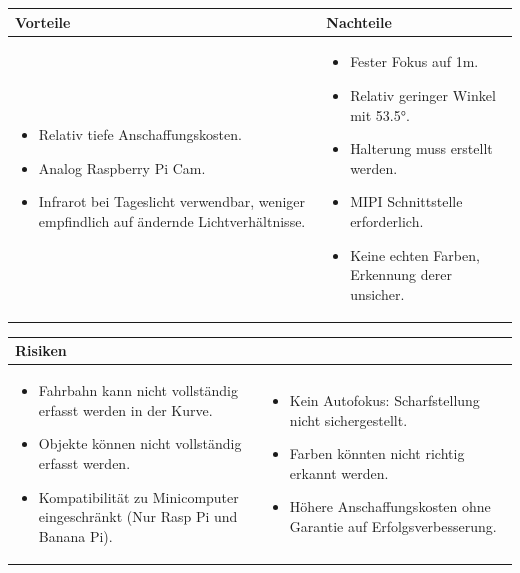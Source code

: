 \begin{table}[h]
\begin{tabular}{p{} | p{}}


 \textbf{Vorteile} & \textbf{Nachteile} \\ \hline
	 
\begin{itemize}
\item Relativ tiefe Anschaffungskosten.
\item Analog Raspberry Pi Cam.
\item Infrarot bei Tageslicht verwendbar, weniger empfindlich auf ändernde Lichtverhältnisse.
\end{itemize}

 
 &
 
\begin{itemize}
\item Fester Fokus auf 1m.
\item Relativ geringer Winkel mit 53.5°.
\item Halterung muss erstellt werden.
\item MIPI Schnittstelle erforderlich.
\item Keine echten Farben, Erkennung derer unsicher.
\end{itemize}

\end{tabular}
\end{table}

\begin{table}[h]
\begin{tabular}{p{}p{}}


 \textbf{Risiken} & \\ \hline
	 
\begin{itemize}
\item Fahrbahn kann nicht vollständig erfasst werden in der Kurve.
\item Objekte können nicht vollständig erfasst werden.
\item Kompatibilität zu Minicomputer eingeschränkt (Nur Rasp Pi und Banana Pi).
\end{itemize}
&
\begin{itemize}
\item Kein Autofokus: Scharfstellung nicht sichergestellt.
\item Farben könnten nicht richtig erkannt werden.
\item Höhere Anschaffungskosten ohne Garantie auf Erfolgsverbesserung.
\end{itemize}

 
\end{tabular}
\end{table}


